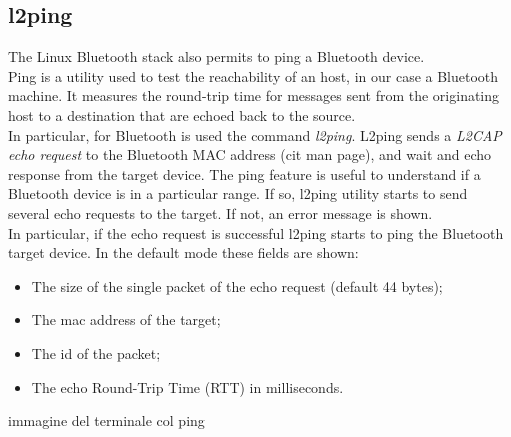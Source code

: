 \subsection{l2ping}
The Linux Bluetooth stack also permits to ping a Bluetooth device.\\
Ping is a utility used to test the reachability of an host, in our case a Bluetooth machine. It measures the round-trip time for messages sent from the originating host to a destination that are echoed back to the source.\\
In particular, for Bluetooth is used the command \textit{l2ping}. L2ping sends a \textit{L2CAP echo request} to the Bluetooth MAC address (cit man page), and wait and echo response from the target device.
The ping feature is useful to understand if a Bluetooth device is in a particular range. If so, l2ping utility starts to send several echo requests to the target. If not, an error message is shown.\\
\linebreak
In particular, if the echo request is successful l2ping starts to ping the Bluetooth target device. In the default mode these fields are shown:\\
\begin{itemize}
\item The size of the single packet of the echo request (default 44 bytes);
\item The mac address of the target;
\item The id of the packet;
\item The echo Round-Trip Time (RTT) in milliseconds.
\end{itemize}

immagine del terminale col ping

